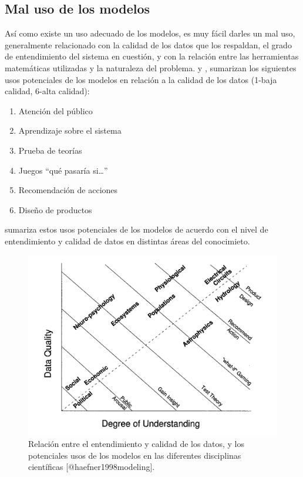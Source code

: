 \documentclass[
]{book}
\providecommand{\tightlist}{%
  \setlength{\itemsep}{0pt}\setlength{\parskip}{0pt}}
\begin{document}
\hypertarget{mal-uso-de-los-modelos}{%
\subsection{Mal uso de los modelos}\label{mal-uso-de-los-modelos}}

Así como existe un uso adecuado de los modelos, es muy fácil darles un mal uso, generalmente relacionado con la calidad de los datos que los respaldan, el grado de entendimiento del sistema en cuestión, y con la relación entre las herramientas matemáticas utilizadas y la naturaleza del problema. \citet{holling1978adaptive} y \citet{karplus1975place}, sumarizan los siguientes usos potenciales de los modelos en relación a la calidad de los datos (1-baja calidad, 6-alta calidad):

\begin{enumerate}
\def\labelenumi{\arabic{enumi}.}
\tightlist
\item
  Atención del público
\item
  Aprendizaje sobre el sistema
\item
  Prueba de teorías
\item
  Juegos ``qué pasaría si\ldots{}''
\item
  Recomendación de acciones
\item
  Diseño de productos
\end{enumerate}

\citet{haefner1998modeling} sumariza estos usos potenciales de los modelos de acuerdo con el nivel de entendimiento y calidad de datos en distintas áreas del conocimieto.

\begin{figure}

{\centering \includegraphics[width=17.99in]{Unidad-I/uso-modelos} 

}

\caption{Relación entre el entendimiento y calidad de los datos, y los potenciales usos de los modelos en las diferentes disciplinas científicas [@haefner1998modeling].}\label{fig:unnamed-chunk-32}
\end{figure}
\end{document}
